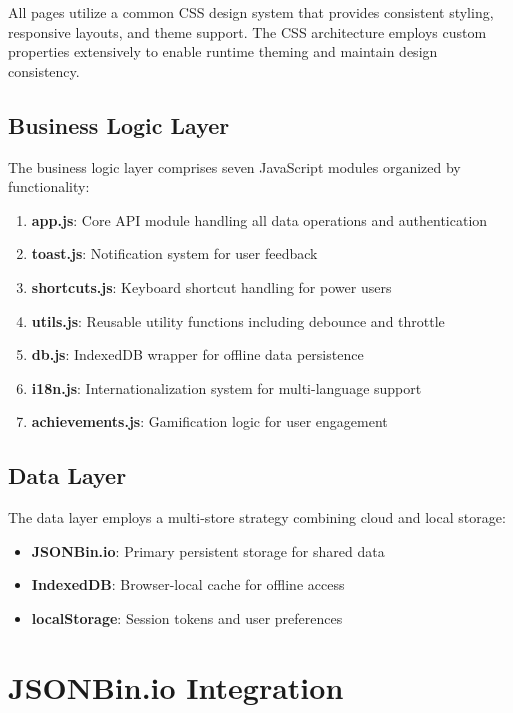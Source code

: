 \documentclass[12pt,a4paper]{report}
\begin{document}
All pages utilize a common CSS design system that provides consistent styling, responsive layouts, and theme support. The CSS architecture employs custom properties extensively to enable runtime theming and maintain design consistency.

\subsection{Business Logic Layer}
\label{sub:business-logic}

The business logic layer comprises seven JavaScript modules organized by functionality:

\begin{enumerate}
    \item \textbf{app.js}: Core API module handling all data operations and authentication
    \item \textbf{toast.js}: Notification system for user feedback
    \item \textbf{shortcuts.js}: Keyboard shortcut handling for power users
    \item \textbf{utils.js}: Reusable utility functions including debounce and throttle
    \item \textbf{db.js}: IndexedDB wrapper for offline data persistence
    \item \textbf{i18n.js}: Internationalization system for multi-language support
    \item \textbf{achievements.js}: Gamification logic for user engagement
\end{enumerate}

\subsection{Data Layer}
\label{sub:data-layer}

The data layer employs a multi-store strategy combining cloud and local storage:

\begin{itemize}
    \item \textbf{JSONBin.io}: Primary persistent storage for shared data
    \item \textbf{IndexedDB}: Browser-local cache for offline access
    \item \textbf{localStorage}: Session tokens and user preferences
\end{itemize}

\section{JSONBin.io Integration}
\label{sec:jsonbin-integration}
\end{document}
